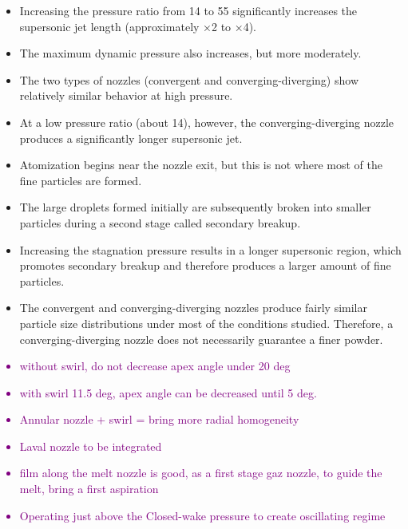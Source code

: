 \documentclass[../main]{subfiles}
\begin{document}
\cite{Mates2005StudyLiquid}
\begin{itemize}
    \item Increasing the pressure ratio from 14 to 55 significantly increases the supersonic jet length (approximately ×2 to ×4).
    \item The maximum dynamic pressure also increases, but more moderately.
    \item The two types of nozzles (convergent and converging-diverging) show relatively similar behavior at high pressure.
    \item At a low pressure ratio (about 14), however, the converging-diverging nozzle produces a significantly longer supersonic jet.
\end{itemize}

\cite{Mates2005StudyLiquida}
\begin{itemize}
    \item Atomization begins near the nozzle exit, but this is not where most of the fine particles are formed.
    \item The large droplets formed initially are subsequently broken into smaller particles during a second stage called secondary breakup.
    \item Increasing the stagnation pressure results in a longer supersonic region, which promotes secondary breakup and therefore produces a larger amount of fine particles.
    \item The convergent and converging-diverging nozzles produce fairly similar particle size distributions under most of the conditions studied. Therefore, a converging-diverging nozzle does not necessarily guarantee a finer powder.
\end{itemize}



\textcolor{Purple}{
\begin{itemize}
    \item without swirl, do not decrease apex angle under 20 deg
    \item with swirl 11.5 deg, apex angle can be decreased until 5 deg.
    \item Annular nozzle + swirl = bring more radial homogeneity
    \item Laval nozzle to be integrated
    \item film along the melt nozzle is good, as a first stage gaz nozzle, to guide the melt, bring a first aspiration
    \item Operating just above the Closed-wake pressure to create oscillating regime
\end{itemize}
}
\end{document}
